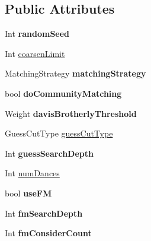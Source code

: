 \subsection*{Public Attributes}
\begin{DoxyCompactItemize}
\item 
Int {\bfseries random\+Seed}\hypertarget{struct_mongoose_1_1_options_aac70ef8acf62bf396cd93b431b102196}{}\label{struct_mongoose_1_1_options_aac70ef8acf62bf396cd93b431b102196}

\item 
Int \hyperlink{struct_mongoose_1_1_options_a240d271ff083f6d841cf8f3ea626dd5a}{coarsen\+Limit}
\item 
Matching\+Strategy {\bfseries matching\+Strategy}\hypertarget{struct_mongoose_1_1_options_a1959e5fe45fe5c34ad08359c8105c96d}{}\label{struct_mongoose_1_1_options_a1959e5fe45fe5c34ad08359c8105c96d}

\item 
bool {\bfseries do\+Community\+Matching}\hypertarget{struct_mongoose_1_1_options_a02849b1dddc8735241a71e09244f5a00}{}\label{struct_mongoose_1_1_options_a02849b1dddc8735241a71e09244f5a00}

\item 
Weight {\bfseries davis\+Brotherly\+Threshold}\hypertarget{struct_mongoose_1_1_options_a16ea5b012fafe024da8ea88b780e78a0}{}\label{struct_mongoose_1_1_options_a16ea5b012fafe024da8ea88b780e78a0}

\item 
Guess\+Cut\+Type \hyperlink{struct_mongoose_1_1_options_a31abd6eab9505fb7d3964e314f75b18c}{guess\+Cut\+Type}
\item 
Int {\bfseries guess\+Search\+Depth}\hypertarget{struct_mongoose_1_1_options_a184d587408236524832734a816a45a4c}{}\label{struct_mongoose_1_1_options_a184d587408236524832734a816a45a4c}

\item 
Int \hyperlink{struct_mongoose_1_1_options_ab1d4fb2e1c43f58fd0e3b0af718cc47e}{num\+Dances}
\item 
bool {\bfseries use\+FM}\hypertarget{struct_mongoose_1_1_options_a1a2b9641093bd7056488f562bdc5f1f8}{}\label{struct_mongoose_1_1_options_a1a2b9641093bd7056488f562bdc5f1f8}

\item 
Int {\bfseries fm\+Search\+Depth}\hypertarget{struct_mongoose_1_1_options_aa5bab04892ff8acdb61c3481c0265422}{}\label{struct_mongoose_1_1_options_aa5bab04892ff8acdb61c3481c0265422}

\item 
Int {\bfseries fm\+Consider\+Count}\hypertarget{struct_mongoose_1_1_options_a6ab7aa097ec7e19639c41b5b591d5f9e}{}\label{struct_mongoose_1_1_options_a6ab7aa097ec7e19639c41b5b591d5f9e}


\end{DoxyCompactItemize}
